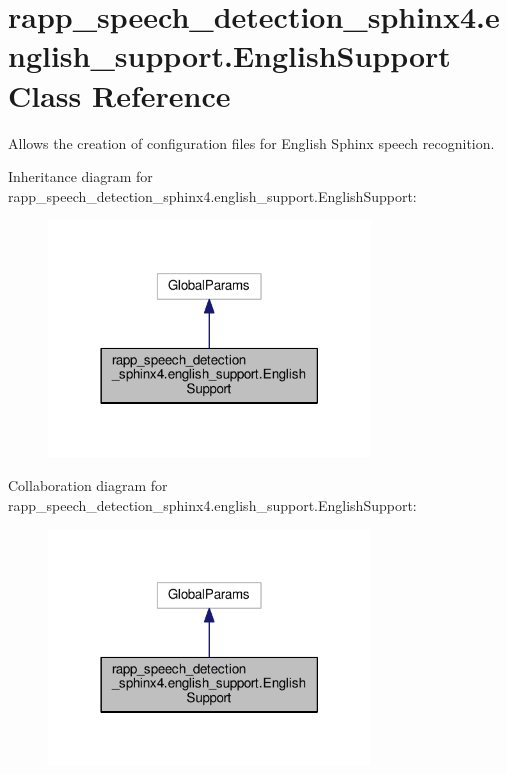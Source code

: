 \hypertarget{classrapp__speech__detection__sphinx4_1_1english__support_1_1EnglishSupport}{\section{rapp\-\_\-speech\-\_\-detection\-\_\-sphinx4.\-english\-\_\-support.\-English\-Support Class Reference}
\label{classrapp__speech__detection__sphinx4_1_1english__support_1_1EnglishSupport}
}


Allows the creation of configuration files for English Sphinx speech recognition.  




Inheritance diagram for rapp\-\_\-speech\-\_\-detection\-\_\-sphinx4.\-english\-\_\-support.\-English\-Support\-:
\nopagebreak
\begin{figure}[H]
\begin{center}
\leavevmode
\includegraphics[width=242pt]{classrapp__speech__detection__sphinx4_1_1english__support_1_1EnglishSupport__inherit__graph}
\end{center}
\end{figure}


Collaboration diagram for rapp\-\_\-speech\-\_\-detection\-\_\-sphinx4.\-english\-\_\-support.\-English\-Support\-:
\nopagebreak
\begin{figure}[H]
\begin{center}
\leavevmode
\includegraphics[width=242pt]{classrapp__speech__detection__sphinx4_1_1english__support_1_1EnglishSupport__coll__graph}
\end{center}
\end{figure}
